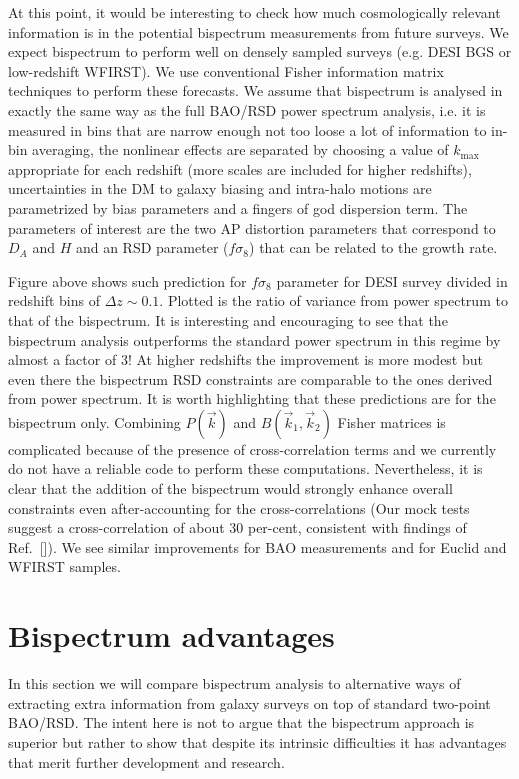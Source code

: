 At this point, it would be interesting to check how much cosmologically
relevant information is in the potential bispectrum measurements from future
surveys. We expect bispectrum to perform well on densely sampled surveys (e.g.
DESI BGS or low-redshift WFIRST). We use conventional Fisher information matrix
techniques to perform these forecasts. We assume that bispectrum is analysed in
exactly the same way as the full BAO/RSD power spectrum analysis, i.e. it is
measured in bins that are narrow enough not too loose a lot of information to
in-bin averaging, the nonlinear effects are separated by choosing a value of
$k_\mathrm{max}$ appropriate for each redshift (more scales are included for
higher redshifts), uncertainties in the DM to galaxy biasing and intra-halo
motions are parametrized by bias parameters and a fingers of god dispersion
term. The parameters of interest are the two AP distortion parameters that
correspond to $D_A$ and $H$ and an RSD parameter ($f\sigma_8$) that can be
related to the growth rate.

Figure above shows such prediction for $f\sigma_8$ parameter for DESI
survey divided in redshift bins of $\Delta z \sim 0.1$. Plotted is the ratio of
variance from power spectrum to that of the bispectrum. It is interesting and
encouraging to see that the bispectrum analysis outperforms the standard power
spectrum in this regime by almost a factor of 3! At higher redshifts the
improvement is more modest but even there the bispectrum RSD constraints are
comparable to the ones derived from power spectrum. It is worth highlighting
that these predictions are for the bispectrum only. Combining $P(\vec{k})$ and
$B(\vec{k}_1,\vec{k}_2)$ Fisher matrices is complicated because of the presence
of cross-correlation terms and we currently do not have a reliable code to
perform these computations. Nevertheless, it is clear that the addition of the
bispectrum would strongly enhance overall constraints even after-accounting for
the cross-correlations (Our mock tests suggest a cross-correlation of about 30
per-cent, consistent with findings of Ref.~[]). We see similar improvements for
BAO measurements and for Euclid and WFIRST samples.

\section{Bispectrum advantages}

In this section we will compare bispectrum analysis to alternative ways of
extracting extra information from galaxy surveys on top of standard two-point
BAO/RSD. The intent here is not to argue that the bispectrum approach is
superior but rather to show that despite its intrinsic difficulties it has
advantages that merit further development and research.

